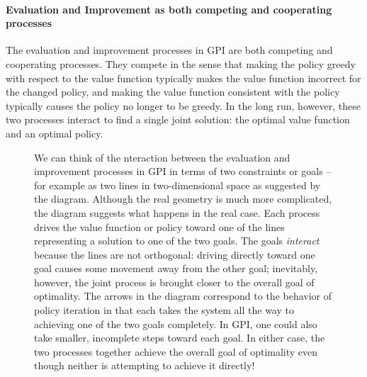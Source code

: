 \documentclass[12pt]{article}
\begin{document}
\paragraph{Evaluation and Improvement as both competing and cooperating processes}
The evaluation and improvement processes in GPI are both competing and cooperating processes. They compete in the sense that making the policy greedy with respect to the value function typically makes the value function incorrect for the changed policy, and making the value function consistent with the policy typically causes the policy no longer to be greedy. In the long run, however, these two processes interact to find a single joint solution: the optimal value function and an optimal policy.

\begin{figure}[h]
  \centering
  \caption{\footnotesize We can think of the nteraction between the evaluation and improvement processes in GPI in terms of two constraints or goals -- for example as two lines in two-dimensional space as suggested by the diagram. Although the real geometry is much more complicated, the diagram suggests what happens in the real case. Each process drives the value function or policy toward one of the lines representing a solution to one of the two goals. The goals \emph{interact} because the lines are not orthogonal: driving directly toward one goal causes some movement away from the other goal; inevitably, however, the joint process is brought closer to the overall goal of optimality. The arrows in the diagram correspond to the behavior of policy iteration in that each takes the system all the way to achieving one of the two goals completely. In GPI, one could also take smaller, incomplete steps toward each goal. In either case, the two processes together achieve the overall goal of optimality even though neither is attempting to achieve it directly!}
\end{figure}
\end{document}
